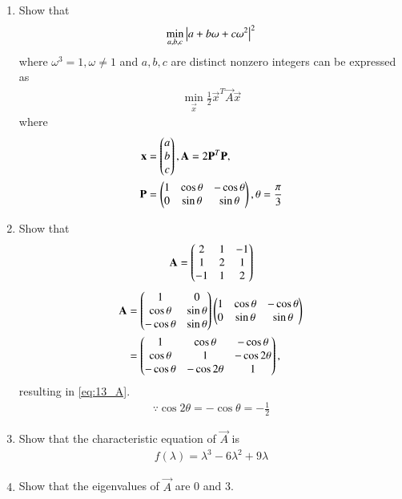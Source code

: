\renewcommand{\theequation}{\theenumi}
\begin{enumerate}[label=\arabic*.,ref=\thesubsection.\theenumi]
\item Show that 
\begin{align}
\min_{a,b,c} \left\vert a + b\omega + c\omega^2\right\vert^2
\end{align}
%
where $\omega^3 = 1, \omega \ne 1$ and $a,b,c$ are distinct nonzero integers
can be expressed as
\begin{align}
\label{eq:13_opt}
\min_{\vec{x}} \frac{1}{2}\vec{x}^T\vec{A}\vec{x}
\end{align}
%
where 
\begin{align}
\mathbf{x}&= \begin{pmatrix}a \\ b \\c\end{pmatrix}, 
\mathbf{A}= 2\mathbf{P}^T\mathbf{P},
\\
\mathbf{P}&= \begin{pmatrix}1 & \cos \theta & -\cos \theta \\ 0 & \sin \theta & \sin \theta\end{pmatrix},
\theta = \frac{\pi}{3} 
\end{align}
\item Show that 
\begin{align}
\label{eq:13_A}
\mathbf{A}  = \begin{pmatrix}
2 & 1 & -1 \\ 
1 & 2 & 1
\\
-1 & 1 & 2
\end{pmatrix}
\end{align}
%
\solution 
\begin{align}
\mathbf{A}&= \begin{pmatrix}1 &  0 \\ \cos \theta & \sin \theta  \\ -\cos \theta  & \sin \theta\end{pmatrix} 
\begin{pmatrix}1 & \cos \theta & -\cos \theta \\ 0 & \sin \theta & \sin \theta\end{pmatrix} 
\nonumber \\
&=\begin{pmatrix}
1 & \cos \theta & -\cos \theta \\ 
\cos \theta & 1 & -\cos 2\theta
\\
-\cos \theta & -\cos 2\theta & 1
\end{pmatrix},
\end{align}
resulting in \eqref{eq:13_A}.
\begin{align}
\because \cos 2 \theta = -\cos \theta = -\frac{1}{2}
\end{align}
\item Show that the characteristic equation of $\vec{A}$ is 
\begin{align}
f(\lambda) = \lambda^3 -6\lambda^2 + 9\lambda
\end{align}
\item Show that the eigenvalues of $\vec{A}$ are 0 and 3.

\end{enumerate}
